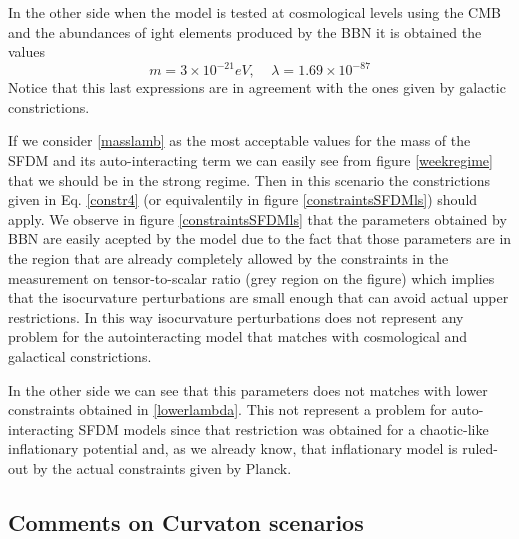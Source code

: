 \documentclass[amssymb,twocolumn,prd,nofootinbib,showpacs]{revtex4-1}
\begin{document}
In the other side when the model is tested at cosmological levels using the CMB and the abundances of ight elements produced by the BBN it is obtained the values \cite{SFphi41,SFphi42}
\begin{equation}\label{masslamb}
m=3\times 10^{-21}eV, \ \ \ \ \ \lambda = 1.69\times 10^{-87}
\end{equation}
Notice that this last expressions are in agreement with the ones given by galactic constrictions.

If we consider \eqref{masslamb} as the most acceptable values for the mass of the SFDM and its auto-interacting term we can easily see from figure \ref{weekregime} that we should be in the strong regime. Then in this scenario the constrictions given in Eq. \eqref{constr4} (or equivalentily in figure \ref{constraintsSFDMls}) should apply. We observe in figure \ref{constraintsSFDMls} that the parameters obtained by BBN are easily acepted by the model due to the fact that those parameters are in the region that are already completely allowed by the constraints in the measurement on tensor-to-scalar ratio (grey region on the figure) which implies that the isocurvature perturbations are small enough that can avoid actual upper restrictions. In this way isocurvature perturbations does not represent any problem for the autointeracting model that matches with cosmological and galactical constrictions.

In the other side we can see that this parameters does not matches with lower constraints obtained in \eqref{lowerlambda}. This not represent a problem for auto-interacting SFDM models since that restriction was obtained for a chaotic-like inflationary potential and, as we already know, that inflationary model is ruled-out by the actual constraints given by Planck.

\subsection{Comments on Curvaton scenarios}
\end{document}
